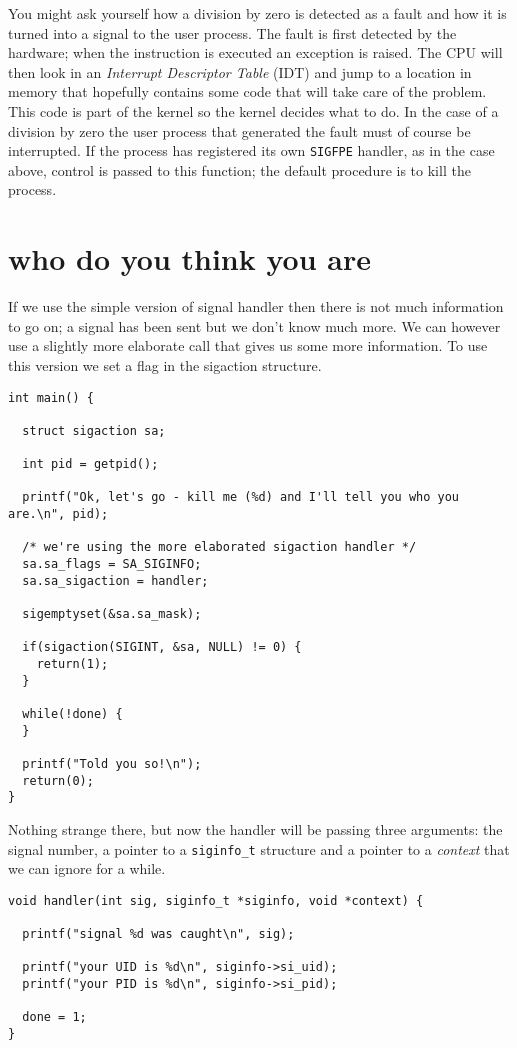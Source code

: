 \documentclass[a4paper,11pt]{article}
\begin{document}
You might ask yourself how a division by zero is detected as a fault
and how it is turned into a signal to the user process. The fault is
first detected by the hardware; when the instruction is executed an
exception is raised. The CPU will then look in an {\em Interrupt
  Descriptor Table} (IDT) and jump to a location in memory that
hopefully contains some code that will take care of the problem. This
code is part of the kernel so the kernel decides what to do. In the
case of a division by zero the user process that generated the fault
must of course be interrupted. If the process has registered its own
{\tt SIGFPE} handler, as in the case above, control is passed to this
function; the default procedure is to kill the process.

\section{who do you think you are}

If we use the simple version of signal handler then there is not much
information to go on; a signal has been sent but we don't know much
more. We can however use a slightly more elaborate call that gives
us some more information. To use this version we set a flag in the
sigaction structure.

\begin{lstlisting}
int main() {

  struct sigaction sa;

  int pid = getpid();

  printf("Ok, let's go - kill me (%d) and I'll tell you who you are.\n", pid);  
  
  /* we're using the more elaborated sigaction handler */
  sa.sa_flags = SA_SIGINFO;
  sa.sa_sigaction = handler;
 
  sigemptyset(&sa.sa_mask);

  if(sigaction(SIGINT, &sa, NULL) != 0) {
    return(1);
  }
  
  while(!done) {
  }

  printf("Told you so!\n");
  return(0);
}
\end{lstlisting}

Nothing strange there, but now the handler will be passing three
arguments: the signal number, a pointer to a {\tt siginfo\_t} structure
and a pointer to a {\em context} that we can ignore for a while.

\begin{lstlisting}
void handler(int sig, siginfo_t *siginfo, void *context) {
  
  printf("signal %d was caught\n", sig);

  printf("your UID is %d\n", siginfo->si_uid);
  printf("your PID is %d\n", siginfo->si_pid);

  done = 1;
}
\end{lstlisting}
\end{document}
